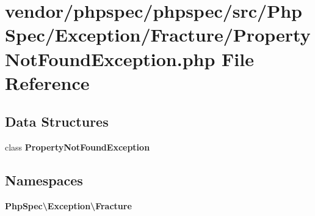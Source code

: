 \section{vendor/phpspec/phpspec/src/\+Php\+Spec/\+Exception/\+Fracture/\+Property\+Not\+Found\+Exception.php File Reference}
\label{_property_not_found_exception_8php}
\subsection*{Data Structures}
\begin{DoxyCompactItemize}
\item 
class {\bf Property\+Not\+Found\+Exception}
\end{DoxyCompactItemize}
\subsection*{Namespaces}
\begin{DoxyCompactItemize}
\item 
 {\bf Php\+Spec\textbackslash{}\+Exception\textbackslash{}\+Fracture}
\end{DoxyCompactItemize}
